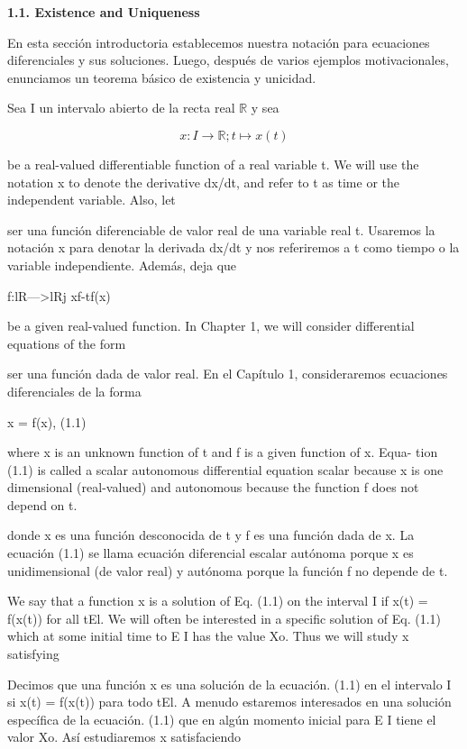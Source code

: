 \documentclass[]{article}
\begin{document}
\hfill

\textbf{1.1. Existence and Uniqueness}

\hfill


En esta sección introductoria establecemos nuestra notación para ecuaciones diferenciales y sus soluciones. Luego, después de varios ejemplos motivacionales, enunciamos un teorema básico de existencia y unicidad.

Sea I un intervalo abierto de la recta real $\mathbb{R}$ y sea

\[
x: I \to \mathbb{R}; t \mapsto x(t)
\]

be a real-valued differentiable function of a real variable t. We will use the notation x to denote the derivative dx/dt, and refer to t as time or the independent variable. Also, let

ser una función diferenciable de valor real de una variable real t. Usaremos la notación x para denotar la derivada dx/dt y nos referiremos a t como tiempo o la variable independiente. Además, deja que

f:lR--->lRj xf-tf(x)

be a given real-valued function. In Chapter 1, we will consider differential equations of the form

ser una función dada de valor real. En el Capítulo 1, consideraremos ecuaciones diferenciales de la forma

x = f(x), (1.1)

where x is an unknown function of t and f is a given function of x. Equa- tion (1.1) is called a scalar autonomous differential equation scalar because x is one dimensional (real-valued) and autonomous because the function f does not depend on t.

donde x es una función desconocida de t y f es una función dada de x. La ecuación (1.1) se llama ecuación diferencial escalar autónoma porque x es unidimensional (de valor real) y autónoma porque la función f no depende de t.

We say that a function x is a solution of Eq. (1.1) on the interval I if x(t) = f(x(t)) for all tEl. We will often be interested in a specific solution of Eq. (1.1) which at some initial time to E I has the value Xo. Thus we will study x satisfying

Decimos que una función x es una solución de la ecuación. (1.1) en el intervalo I si x(t) = f(x(t)) para todo tEl. A menudo estaremos interesados ​​en una solución específica de la ecuación. (1.1) que en algún momento inicial para E I tiene el valor Xo. Así estudiaremos x satisfaciendo
\end{document}
